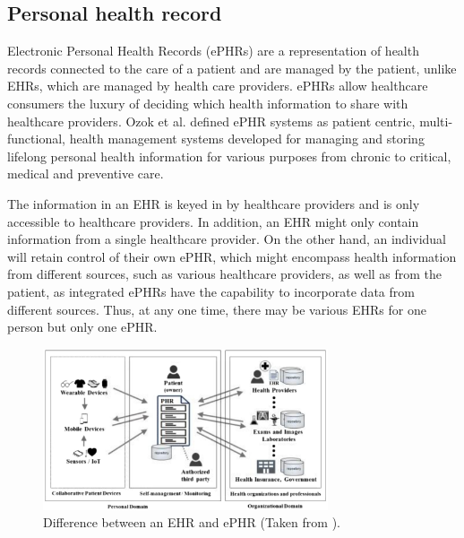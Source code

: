\subsection{Personal health record}
Electronic Personal Health Records (ePHRs) are a representation of health records connected to the care of a patient and are managed by the patient\cite{demirisPatientcenteredApplicationsUse2008}, unlike EHRs, which are managed by health care providers. ePHRs allow healthcare consumers the luxury of deciding which health information to share with healthcare providers\cite{tangPersonalHealthRecords2006}. Ozok et al.\cite{PaperbasedComputerbasedRecords} defined ePHR systems as patient centric, multi-functional, health management systems developed for managing and storing lifelong personal health information for various purposes from chronic to critical, medical and preventive care\cite{alsahafiOverviewElectronicPersonal2018}.

The information in an EHR is keyed in by healthcare providers and is only accessible to healthcare providers. In addition, an EHR might only contain information from a single healthcare provider. On the other hand, an individual will retain control of their own ePHR, which might encompass health information from different sources, such as various healthcare providers, as well as from the patient, as integrated ePHRs have the capability to incorporate data from different sources. Thus, at any one time, there may be various EHRs for one person but only one ePHR\cite{alsahafiOverviewElectronicPersonal2018}.
\begin{figure}[h!]
  \center
  \includegraphics[width=0.75\textwidth]{images/chapter1/phr_ehr.PNG}
  \caption{Difference between an EHR and ePHR (Taken from \cite{alsahafiOverviewElectronicPersonal2018}).}
  \label{fig:ehrvsphr}
\end{figure}

